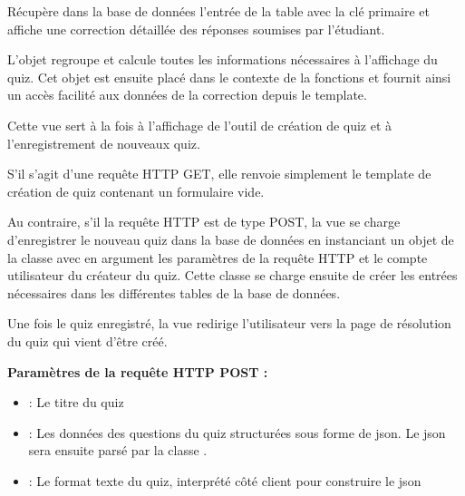 \documentclass[a4,10pt,french]{sphinxmanual}
\begin{document}

\begin{fulllineitems}
\label{source:quiz.views.correct}
Récupère dans la base de données l'entrée de la table  avec
la clé primaire  et affiche une correction détaillée des réponses soumises
par l'étudiant.

L'objet  regroupe et calcule toutes les informations nécessaires
à l'affichage du quiz. Cet objet est ensuite placé dans le contexte de la fonctions
 et fournit ainsi un accès facilité aux données de la correction depuis
le template.

\end{fulllineitems}


\begin{fulllineitems}
\label{source:quiz.views.create}
Cette vue sert à la fois à l'affichage de l'outil de création de quiz et à
l'enregistrement de nouveaux quiz.

S'il s'agit d'une requête HTTP GET, elle renvoie simplement le template de
création de quiz contenant un formulaire vide.

Au contraire, s'il la requête HTTP est de type POST, la vue se charge d'enregistrer
le nouveau quiz dans la base de données en instanciant un objet de la classe
{\hyperref[source:quiz.utils.save.SaveQuiz]{\emph{}}} avec en argument les paramètres de la requête HTTP et le compte
utilisateur du créateur du quiz. Cette
classe se charge ensuite de créer les entrées nécessaires dans les différentes tables de
la base de données.

Une fois le quiz enregistré, la vue redirige l'utilisateur vers la page de
résolution du quiz qui vient d'être créé.

\textbf{Paramètres de la requête HTTP POST :}
\begin{itemize}
\item {} 
 : Le titre du quiz

\item {} 
 : Les données des questions du quiz structurées sous forme de json. Le json sera ensuite parsé par la classe .

\item {} 
 : Le format texte du quiz, interprété côté client pour construire le json

\end{itemize}

\end{fulllineitems}
\end{document}
